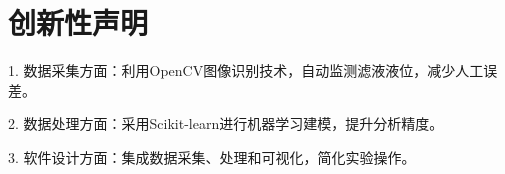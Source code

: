 
\section{创新性声明}

1. 数据采集方面：利用OpenCV图像识别技术，自动监测滤液液位，减少人工误差。

2. 数据处理方面：采用Scikit-learn进行机器学习建模，提升分析精度。

3. 软件设计方面：集成数据采集、处理和可视化，简化实验操作。